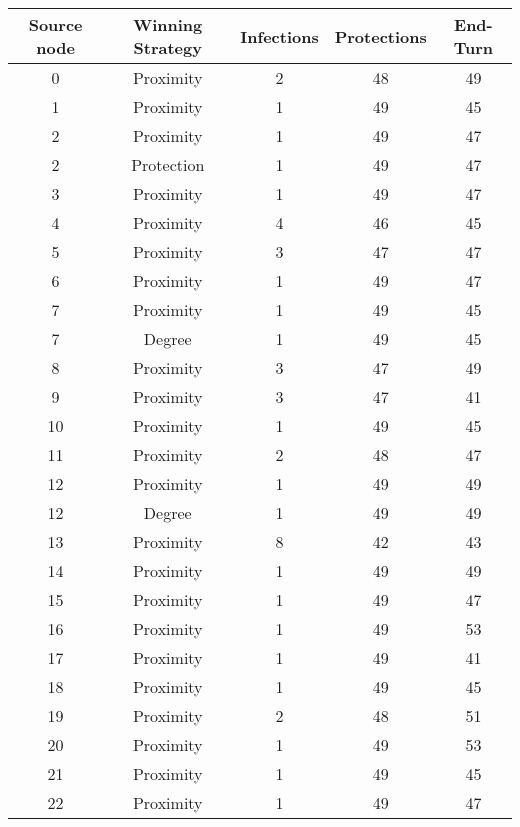 \documentclass[results.tex]{subfiles}
\begin{document}
\begin{center}
  \begin{tabular}{| c || c | c | c | c |}
    \hline
    {\bfseries Source node} & {\bfseries Winning Strategy} & {\bfseries Infections} & {\bfseries Protections} & {\bfseries End-Turn} \\  %
    \hline\hline
    0 & Proximity & 2 & 48 & 49 \\ 
    \hline
    1 & Proximity & 1 & 49 & 45 \\ 
    \hline
    2 & Proximity & 1 & 49 & 47 \\ 
    \hline
    2 & Protection & 1 & 49 & 47 \\ 
    \hline
    3 & Proximity & 1 & 49 & 47 \\ 
    \hline
    4 & Proximity & 4 & 46 & 45 \\ 
    \hline
    5 & Proximity & 3 & 47 & 47 \\ 
    \hline
    6 & Proximity & 1 & 49 & 47 \\ 
    \hline
    7 & Proximity & 1 & 49 & 45 \\ 
    \hline
    7 & Degree & 1 & 49 & 45 \\ 
    \hline
    8 & Proximity & 3 & 47 & 49 \\ 
    \hline
    9 & Proximity & 3 & 47 & 41 \\ 
    \hline
    10 & Proximity & 1 & 49 & 45 \\ 
    \hline
    11 & Proximity & 2 & 48 & 47 \\ 
    \hline
    12 & Proximity & 1 & 49 & 49 \\ 
    \hline
    12 & Degree & 1 & 49 & 49 \\ 
    \hline
    13 & Proximity & 8 & 42 & 43 \\ 
    \hline
    14 & Proximity & 1 & 49 & 49 \\ 
    \hline
    15 & Proximity & 1 & 49 & 47 \\ 
    \hline
    16 & Proximity & 1 & 49 & 53 \\ 
    \hline
    17 & Proximity & 1 & 49 & 41 \\ 
    \hline
    18 & Proximity & 1 & 49 & 45 \\ 
    \hline
    19 & Proximity & 2 & 48 & 51 \\ 
    \hline
    20 & Proximity & 1 & 49 & 53 \\ 
    \hline
    21 & Proximity & 1 & 49 & 45 \\ 
    \hline
    22 & Proximity & 1 & 49 & 47 \\ 

\end{tabular}
\end{center}
\end{document}
